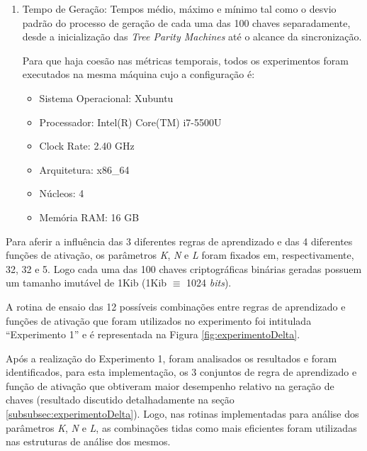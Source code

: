 \documentclass[a4paper,10pt,oneside,conference,final,keeplastbox]{inatel}
\newcommand{\bits}{\textit{bits}\xspace}
\begin{document}
\begin{enumerate}
                \item Tempo de Geração:
                    Tempos médio, máximo e mínimo tal como o desvio padrão do processo de geração de cada uma das 100 chaves separadamente, desde a inicialização das \textit{Tree Parity Machines} até o alcance da sincronização.
                    
                    Para que haja coesão nas métricas temporais, todos os experimentos foram executados na mesma máquina cujo a configuração é:
                    
                    \begin{itemize}
                        \item Sistema Operacional: Xubuntu
                        \item Processador: Intel(R) Core(TM) i7-5500U
                        \item Clock Rate: 2.40 GHz
                        \item Arquitetura: x86\_64
                        \item Núcleos: 4
                        \item Memória RAM: 16 GB
                    \end{itemize}

            \end{enumerate}

            Para aferir a influência das 3 diferentes regras de aprendizado e das 4 diferentes funções de ativação, os parâmetros \textit{K}, \textit{N} e \textit{L} foram fixados em, respectivamente, 32, 32 e 5. Logo cada uma das 100 chaves criptográficas binárias geradas possuem um tamanho imutável de 1Kib (1Kib $\equiv$ 1024 \bits).
            
            A rotina de ensaio das 12 possíveis combinações entre regras de aprendizado e funções de ativação que foram utilizados no experimento foi intitulada ``Experimento 1'' e é representada na Figura \ref{fig:experimentoDelta}.

            

            Após a realização do Experimento 1, foram analisados os resultados e foram identificados, para esta implementação, os 3 conjuntos de regra de aprendizado e função de ativação que obtiveram maior desempenho relativo na geração de chaves (resultado discutido detalhadamente na seção \ref{subsubsec:experimentoDelta}). Logo, nas rotinas implementadas para análise dos parâmetros \textit{K}, \textit{N} e \textit{L}, as combinações tidas como mais eficientes foram utilizadas nas estruturas de análise dos mesmos.
\end{document}
